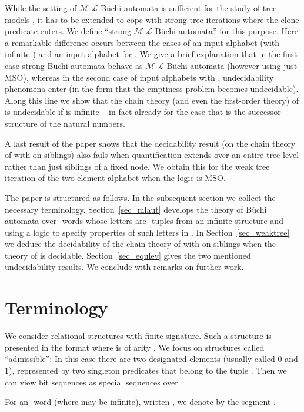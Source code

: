 \documentclass[copyright,creativecommons]{eptcs}
\theoremstyle{plain}
\theoremstyle{nonumberplain}
\newcommand{\m}{\ensuremath{\mathcal{M}}}
\newcommand{\el}{\ensuremath{\mathcal{L}}}
\newcommand{\ml}{\ensuremath{\m\textrm{-}\el}}
\begin{document}
While the setting of \ml-B\"uchi automata 
is sufficient for the study of tree models , it has to be extended 
to cope with strong tree iterations  where the clone predicate
enters. We define ``strong \ml-B\"uchi automata'' for this purpose. 
Here a remarkable difference occurs between the cases of 
an input alphabet  (with infinite ) and an input alphabet  
for . We give a brief explanation that in the first case 
strong B\"uchi automata behave as \ml-B\"uchi automata (however
using just  MSO), whereas in the second case of input alphabets  with , 
 undecidability phenomena enter (in the form that the emptiness 
 problem becomes undecidable). Along this line we show that the chain theory (and even the first-order theory) of  is undecidable if  is infinite -- in fact already for the case that  is the successor structure of the natural numbers.
  
A last result of the paper shows that the decidability result 
(on the chain theory of  with  on siblings) 
also fails when quantification extends over an entire tree level 
rather than just siblings of a fixed node. We obtain this 
for the weak tree iteration of the two element alphabet  
when the logic  is MSO.   

The paper is structured as follows. In the subsequent section we 
collect the necessary terminology. Section~\ref{sec_mlaut} develops the theory 
of B\"uchi automata over -words whose letters are 
-tuples from an infinite structure  and using a logic  to specify 
properties of such letters in . 
In Section~\ref{sec_weaktree} we deduce the decidability 
of the chain theory of  with  on siblings when the 
-theory of  is decidable. Section~\ref{sec_equlev} gives the two mentioned
undecidability results. We conclude with remarks on further work. 



\section{Terminology}\label{sec_term}



We consider relational structures with finite signature. Such a structure 
is presented in the format  where  is of arity . 
We focus on structures called ``admissible'': In this case there are 
two designated elements (usually called 0 and 1), represented by 
two singleton predicates  that belong to the tuple .
Then we can view bit sequences as special sequences over . 

For an -word  (where  may be infinite), 
written ,  
we denote by  the segment .
\end{document}
